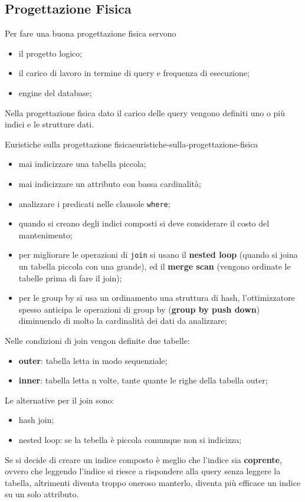 \documentclass[12pt]{article}
\begin{document}
\subsection{Progettazione Fisica}
Per fare una buona progettazione fisica servono
\begin{itemize}
    \item il progetto logico;
    \item il carico di lavoro in termine di query e frequenza di esecuzione;
    \item engine del database;
\end{itemize}
Nella progettazione fisica dato il carico delle query vengono definiti uno o pi\`u indici e le strutture dati.
\begin{theorem}{Euristiche sulla progettazione fisica}{euristiche-sulla-progettazione-fisica}
\begin{itemize}
    \item mai indicizzare una tabella piccola;
    \item mai indicizzare un attributo con bassa cardinalit\`a;
    \item analizzare i predicati nelle clausole \texttt{where};
    \item quando si creano degli indici composti si deve considerare il costo del mantenimento;
    \item per migliorare le operazioni di \texttt{join} si usano il \textbf{nested loop} (quando si joina un tabella piccola con una grande), ed il \textbf{merge scan} (vengono ordinate le tabelle prima di fare il join);
    \item per le group by si usa un ordinamento una struttura di hash, l'ottimizzatore spesso anticipa le operazioni di group by (\textbf{group by push down}) diminuendo di molto la cardinalit\`a dei dati da analizzare;
\end{itemize}
\end{theorem}
Nelle condizioni di join vengon definite due tabelle:
\begin{itemize}
    \item \textbf{outer}: tabella letta in modo sequenziale;
    \item \textbf{inner}: tabella letta n volte, tante quante le righe della tabella outer;
\end{itemize}
Le alternative per il join sono:
\begin{itemize}
    \item hash join;
    \item nested loop: se la tebella \`e piccola comunque non si indicizza;
\end{itemize}
Se si decide di creare un indice composto \`e meglio che l'indice sia \textbf{coprente}, ovvero che leggendo l'indice si riesce a rispondere alla query senza leggere la tabella, altrimenti diventa troppo oneroso manterlo, diventa pi\`u efficace un indice su un solo attributo.
\end{document}
